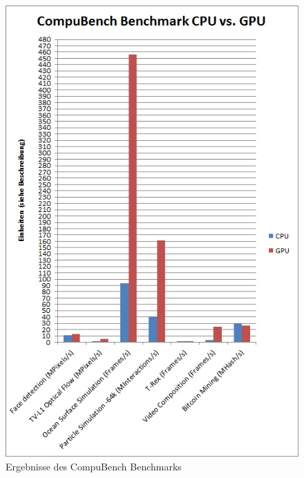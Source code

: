 \begin{figure}[!h]
	\begin{center}
		\includegraphics[width=0.8\linewidth]{images/CompuBench.png}
		\caption{Ergebnisse des CompuBench Benchmarks}
		\label{CompuBench}
	\end{center}
\end{figure}


